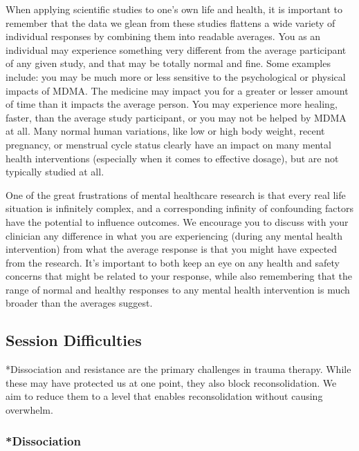 \documentclass[12pt,letterpaper]{article}
\begin{document}
When applying scientific studies to one's own life and health, it is important to remember that the data we glean from these studies flattens a wide variety of individual responses by combining them into readable averages. You as an individual may experience something very different from the average participant of any given study, and that may be totally normal and fine. Some examples include: you may be much more or less sensitive to the psychological or physical impacts of MDMA. The medicine may impact you for a greater or lesser amount of time than it impacts the average person. You may experience more healing, faster, than the average study participant, or you may not be helped by MDMA at all.  Many normal human variations, like low or high body weight, recent pregnancy, or menstrual cycle status clearly have an impact on many mental health interventions (especially when it comes to effective dosage), but are not typically studied at all.

One of the great frustrations of mental healthcare research is that every real life situation is infinitely complex, and a corresponding infinity of confounding factors have the potential to influence outcomes. We encourage you to discuss with your clinician any difference in what you are experiencing (during any mental health intervention) from what the average response is that you might have expected from the research. It's important to both keep an eye on any health and safety concerns that might be related to your response, while also remembering that the range of normal and healthy responses to any mental health intervention is much broader than the averages suggest.
\subsection{Session Difficulties}
\label{sec:dissociationandresistance}
*Dissociation and resistance are the primary challenges in trauma therapy. While these may have protected us at one point, they also block reconsolidation. We aim to reduce them to a level that enables reconsolidation without causing overwhelm.

\subsubsection{*Dissociation}
\end{document}
